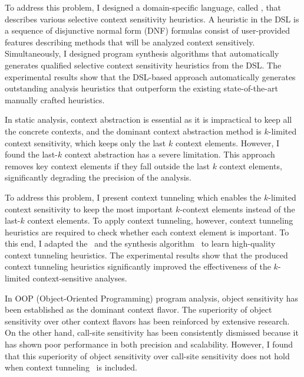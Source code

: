 \documentclass[11pt]{article}
\newcommand{\myparagraph}[1]{\medskip\noindent{\it \textbf{#1.}}}
\begin{document}
To address this problem, I designed a domain-specific language, called \DisjunctiveModel, that describes various selective context sensitivity heuristics.
%
A heuristic in the DSL is a sequence of disjunctive normal form (DNF) formulas consist of user-provided features describing methods that will be analyzed context sensitively.
%
Simultaneously, I designed program synthesis algorithms that automatically generates qualified selective context sensitivity heuristics from the DSL.
%
The experimental results show that the DSL-based approach automatically generates outstanding analysis heuristics that outperform the existing state-of-the-art manually crafted heuristics.
%



\myparagraph{Context Tunneling~\cite{JeJeOh18}}
%
In static analysis, context abstraction is essential as it is impractical to keep all the concrete contexts, and the dominant context abstraction method is $k$-limited context sensitivity, which keeps only the last $k$ context elements.
%
However, I found the last-$k$ context abstraction has a severe limitation. 
%
This approach removes key context elements if they fall outside the last $k$ context elements, significantly degrading the precision of the analysis.




To address this problem, I present context tunneling which enables the $k$-limited context sensitivity to keep the most important $k$-context elements instead of the last-$k$ context elements.
%
To apply context tunneling, however, context tunneling heuristics are required to check whether each context element is important.
%
To this end, I adapted the \DisjunctiveModel~and the synthesis algorithm~\cite{JeJeChOh17} to learn high-quality context tunneling heuristics.
%
The experimental results show that the produced context tunneling heuristics significantly improved the effectiveness of the $k$-limited context-sensitive analyses.




\myparagraph{Obj2CFA~\cite{JeOh22}}
%
In OOP (Object-Oriented Programming) program analysis, object sensitivity has been established as the dominant context flavor.
%
The superiority of object sensitivity over other context flavors has been reinforced by extensive research.
%
On the other hand, call-site sensitivity has been consistently dismissed because it has shown poor performance in both precision and scalability.
%
However, I found that this superiority of object sensitivity over call-site sensitivity does not hold when context tunneling~\cite{JeJeOh18} is included.
\end{document}
